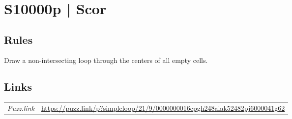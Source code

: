 \section[S10000p | Scor {[\emph{Simple Loop}]}]{S10000p | {\normalfont Scor}}
\label{sec:27-s10000p-scor}

\subsection*{Rules}
\begin{markdown}
Draw a non-intersecting loop through the centers of all empty cells.
\end{markdown}
\subsection*{Links}
\begin{tabularx}{\textwidth}{l X}
\emph{Puzz.link} & \url{https://puzz.link/p?simpleloop/21/9/0000000016cpgh248alak52482pj6000041g62} \\
\end{tabularx}
\pagebreak
